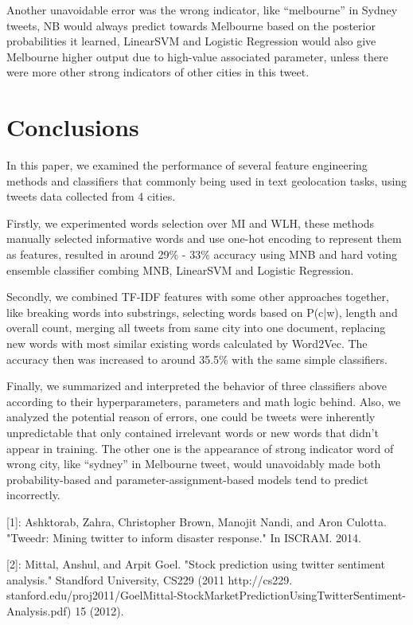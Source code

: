 \documentclass[11pt]{article}
\begin{document}
Another unavoidable error was the wrong indicator, like “melbourne” in Sydney tweets, NB would always predict towards Melbourne based on the posterior probabilities it learned, LinearSVM and Logistic Regression would also give Melbourne higher output due to high-value associated parameter, unless there were more other strong indicators of other cities in this tweet. 

\section{Conclusions}

In this paper, we examined the performance of several feature engineering methods and classifiers that commonly being used in text geolocation tasks, using tweets data collected from 4 cities.

Firstly, we experimented words selection over MI and WLH, these methods manually selected informative words and use one-hot encoding to represent them as features, resulted in around 29\% - 33\% accuracy using MNB and hard voting ensemble classifier combing MNB, LinearSVM and Logistic Regression.

Secondly, we combined TF-IDF features with some other approaches together, like breaking words into substrings, selecting words based on P(c|w), length and overall count, merging all tweets from same city into one document, replacing new words with most similar existing words calculated by Word2Vec. The accuracy then was increased to around 35.5\% with the same simple classifiers.

Finally, we summarized and interpreted the behavior of three classifiers above according to their hyperparameters, parameters and math logic behind. Also, we analyzed the potential reason of errors, one could be tweets were inherently unpredictable that only contained irrelevant words or new words that didn’t appear in training. The other one is the appearance of strong indicator word of wrong city, like “sydney” in Melbourne tweet, would unavoidably made both probability-based and parameter-assignment-based models tend to predict incorrectly. 




[1]: Ashktorab, Zahra, Christopher Brown, Manojit Nandi, and Aron Culotta. "Tweedr: Mining twitter to inform disaster response." In ISCRAM. 2014.

[2]: Mittal, Anshul, and Arpit Goel. "Stock prediction using twitter sentiment analysis." Standford University, CS229 (2011 http://cs229. stanford.edu/proj2011/GoelMittal-StockMarketPredictionUsingTwitterSentiment-Analysis.pdf) 15 (2012).
\end{document}
